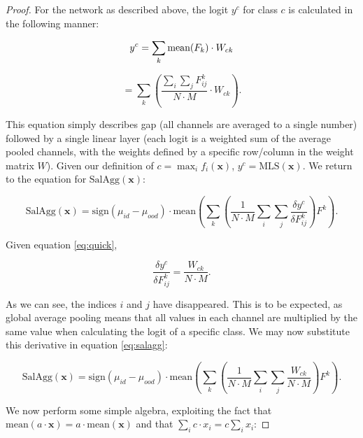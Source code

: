 \documentclass[UKenglish]{uiomasterthesis} %
\theoremstyle{definition}
\begin{document}
\begin{proof}
\noindent For the network as described above, the logit $y^c$ for class $c$ is calculated in the following manner:

\begin{equation}
    y^c = \sum_k \text{mean}(F_k) \cdot W_{ck} \\
\end{equation}

\begin{equation} \label{eq:quick}
    = \sum_k \left( \frac{\sum_i \sum_j F^k_{ij}}{N \cdot M} \cdot W_{ck} \right) .
\end{equation}

\noindent This equation simply describes \ac{gap} (all channels are averaged to a single number) followed by a single linear layer (each logit is a weighted sum of the average pooled channels, with the weights defined by a specific row/column in the weight matrix $W$). Given our definition of $c = \max_i f_i(\bm{x})$, $y^c = \text{MLS}(\bm{x})$. We return to the equation for $\text{SalAgg}(\bm{x})$:

\begin{equation} \label{eq:salagg}
    \text{SalAgg}(\bm{x}) = \text{sign}(\mu_{id} - \mu_{ood}) \cdot \text{mean} \left(\sum_k \left( \frac{1}{N \cdot M} \sum_i \sum_j \frac{\delta y^c}{\delta F_{ij}^k} \right) F^k \right).
\end{equation}

\noindent Given equation \ref{eq:quick},

\begin{equation}
    \frac{\delta y^c}{\delta F^k_{ij}} = \frac{W_{ck}}{N \cdot M}.
\end{equation}

\noindent As we can see, the indices $i$ and $j$ have disappeared. This is to be expected, as global average pooling means that all values in each channel are multiplied by the same value when calculating the logit of a specific class. We may now substitute this derivative in equation \ref{eq:salagg}:

\begin{equation}
    \text{SalAgg}(\bm{x}) = \text{sign}(\mu_{id} - \mu_{ood}) \cdot \text{mean} \left(\sum_k \left( \frac{1}{N \cdot M} \sum_i \sum_j \frac{W_{ck}}{N \cdot M} \right) F^k \right).
\end{equation}

\noindent We now perform some simple algebra, exploiting the fact that $\text{mean}(a \cdot \bm{x}) = a \cdot \text{mean}(\bm{x})$ and that $\sum_i c \cdot x_i = c \sum_i x_i$:


\end{proof}
\end{document}
